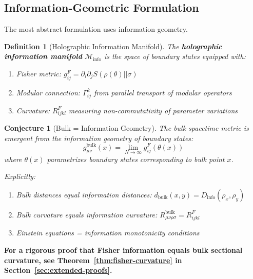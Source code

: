 \documentclass[12pt,a4paper]{article}
\newtheorem{conjecture}[theorem]{Conjecture}
\newtheorem{definition}[theorem]{Definition}
\begin{document}
\subsection{Information-Geometric Formulation}

The most abstract formulation uses information geometry.

\begin{definition}[Holographic Information Manifold]
The \textbf{holographic information manifold} $\mathcal{M}_{\text{info}}$ is the space of boundary states equipped with:
\begin{enumerate}
    \item Fisher metric: $g^{F}_{ij} = \partial_i \partial_j S(\rho(\theta) || \sigma)$
    \item Modular connection: $\Gamma^k_{ij}$ from parallel transport of modular operators
    \item Curvature: $R^{F}_{ijkl}$ measuring non-commutativity of parameter variations
\end{enumerate}
\end{definition}

\begin{conjecture}[Bulk = Information Geometry]
The bulk spacetime metric is \textit{emergent} from the information geometry of boundary states:
\begin{equation}
g^{\text{bulk}}_{\mu\nu}(x) = \lim_{N \to \infty} g^{F}_{ij}(\theta(x))
\end{equation}
where $\theta(x)$ parametrizes boundary states corresponding to bulk point $x$.

Explicitly:
\begin{enumerate}
    \item Bulk distances equal information distances: $d_{\text{bulk}}(x,y) = D_{\text{info}}(\rho_x, \rho_y)$
    \item Bulk curvature equals information curvature: $R^{\text{bulk}}_{\mu\nu\rho\sigma} = R^{F}_{ijkl}$
    \item Einstein equations = information monotonicity conditions
\end{enumerate}
\end{conjecture}

\textbf{For a rigorous proof that Fisher information equals bulk sectional curvature, see Theorem~\ref{thm:fisher-curvature} in Section~\ref{sec:extended-proofs}.}
\end{document}
